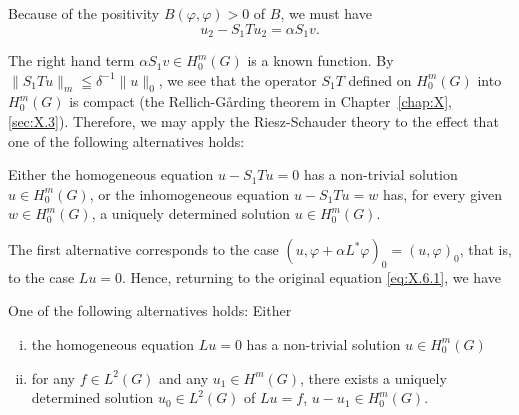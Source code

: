 Because of the positivity $B(\varphi, \varphi) > 0$ of $B$, we must have 
\begin{equation}\tag{1''}\label{eq:X.6.1''}
u _{2} - S _{1} T u _{2} = \alpha S _{1} v.
\end{equation}

The right hand term $\alpha S_1 v \in H_0^m(G)$ is a known function. By $\|S_1 T u\|_m \leqq \delta^{-1} \|u\|_0$, we see that the operator $S_1 T$ defined on $H_0^m(G)$ into $H_0^m(G)$ is compact (the Rellich-Gårding theorem in Chapter~\ref{chap:X}, \ref{sec:X.3}). Therefore, we may apply the Riesz-Schauder theory to the effect that one of the following alternatives holds: 

Either the homogeneous equation $u - S_1 Tu = 0$ has a non-trivial solution $u \in H_0^m(G)$, or the inhomogeneous equation $u - S_1 Tu = w$ has, for every given $w \in H_0^m(G)$, a uniquely determined solution $u \in H_0^m(G)$. 

The first alternative corresponds to the case $(u, \varphi + \alpha L^{*}\varphi)_{0} = (u, \varphi)_{0}$, that is, to the case $Lu = 0$. Hence, returning to the original equation \eqref{eq:X.6.1}, we have 

\begin{theoremu} One of the following alternatives holds: Either \begin{enumerate}[i)]
\item the homogeneous equation $L u = 0$ has a non-trivial solution $u \in H_0^m(G)$
\item for any $f \in L^2(G)$ and any $u_1 \in H^m(G)$, there exists a uniquely determined solution $u_0 \in L^2(G)$ of $L u = f$, $u - u_1 \in H_0^m(G)$.
\end{enumerate}
\end{theoremu}
